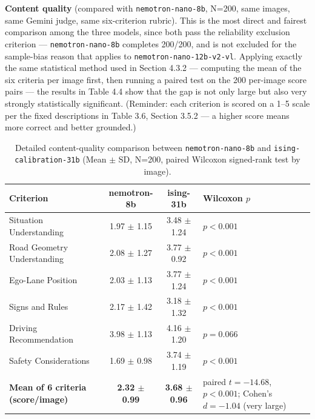 \documentclass[12pt,a4paper]{report}
\begin{document}
\textbf{Content quality} (compared with \texttt{nemotron-nano-8b}, N=200, same images, same Gemini judge, same six-criterion rubric). This is the most direct and fairest comparison among the three models, since both pass the reliability exclusion criterion --- \texttt{nemotron-nano-8b} completes 200/200, and is not excluded for the sample-bias reason that applies to \texttt{nemotron-nano-12b-v2-vl}. Applying exactly the same statistical method used in Section 4.3.2 --- computing the mean of the six criteria per image first, then running a paired test on the 200 per-image score pairs --- the results in Table 4.4 show that the gap is not only large but also very strongly statistically significant. (Reminder: each criterion is scored on a 1--5 scale per the fixed descriptions in Table 3.6, Section 3.5.2 --- a higher score means more correct and better grounded.)

\begin{table}[htbp]
    \centering
    \footnotesize
    \caption[Detailed content-quality comparison between nemotron-nano-8b and ising-calibration-31b]{Detailed content-quality comparison between \texttt{nemotron-nano-8b} and \texttt{ising-calibration-31b} (Mean $\pm$ SD, N=200, paired Wilcoxon signed-rank test by image).}
    \label{tab:4.4}
    \begin{tabular}{@{}p{3.4cm}cc p{3.6cm}@{}}
        \toprule
        \textbf{Criterion} & \textbf{nemotron-8b} & \textbf{ising-31b} & \textbf{Wilcoxon $p$} \\
        \midrule
        Situation Understanding  & 1.97 $\pm$ 1.15 & 3.48 $\pm$ 1.24 & $p<0.001$ \\
        Road Geometry Understanding       & 2.08 $\pm$ 1.27 & 3.77 $\pm$ 0.92 & $p<0.001$ \\
        Ego-Lane Position       & 2.03 $\pm$ 1.13 & 3.77 $\pm$ 1.24 & $p<0.001$ \\
        Signs and Rules       & 2.17 $\pm$ 1.42 & 3.18 $\pm$ 1.32 & $p<0.001$ \\
        Driving Recommendation   & 3.98 $\pm$ 1.13 & 4.16 $\pm$ 1.20 & $p=0.066$ \\
        Safety Considerations    & 1.69 $\pm$ 0.98 & 3.74 $\pm$ 1.19 & $p<0.001$ \\
        \textbf{Mean of 6 criteria (score/image)} & \textbf{2.32 $\pm$ 0.99} & \textbf{3.68 $\pm$ 0.96} & paired $t=-14.68$, $p<0.001$; Cohen's $d=-1.04$ (very large) \\
        \bottomrule
    \end{tabular}
\end{table}
\end{document}
